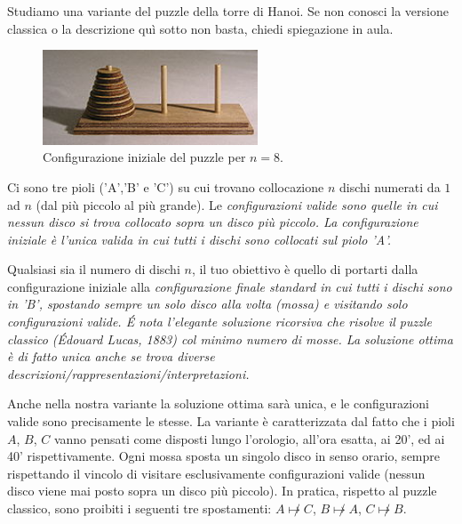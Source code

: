 \renewcommand{\nomebreve}{hanoi\_clockwise}
\renewcommand{\titolo}{The Hanoi puzzle with only clockwise moves}

\introduzione{}

Studiamo una variante del puzzle della torre di Hanoi. Se non conosci la versione classica o la descrizione quì sotto non basta, chiedi spiegazione in aula.

\begin{figure}[h!]
\begin{center}
  \noindent \includegraphics[width=0.57\textwidth]{figures/220px-Tower_of_Hanoi.jpeg}
\end{center}
\caption{Configurazione iniziale del puzzle per $n=8$.}
\end{figure}

Ci sono tre pioli ('A','B' e 'C') su cui trovano collocazione $n$ dischi numerati da $1$ ad $n$ (dal più piccolo al più grande). Le \it{configurazioni valide} sono quelle in cui nessun disco si trova collocato sopra un disco più piccolo.
La \it{configurazione iniziale} è l'unica valida in cui tutti i dischi sono collocati sul piolo 'A'.


Qualsiasi sia il numero di dischi $n$, il tuo obiettivo è quello di portarti dalla configurazione iniziale alla \it{configurazione finale standard} in cui tutti i dischi sono in 'B', spostando sempre un solo disco alla volta (mossa) e visitando solo configurazioni valide.
\'E nota l'elegante soluzione ricorsiva che risolve il puzzle classico (Édouard Lucas, 1883) col minimo numero di mosse. La soluzione ottima è di fatto unica anche se trova diverse descrizioni/rappresentazioni/interpretazioni.

Anche nella nostra variante la soluzione ottima sarà unica, e le configurazioni valide sono precisamente le stesse. La variante è caratterizzata dal fatto che i pioli $A$, $B$, $C$ vanno pensati come disposti lungo l'orologio, all'ora esatta, ai 20', ed ai 40' rispettivamente.
Ogni mossa sposta un singolo disco in senso orario, sempre rispettando il vincolo di visitare esclusivamente configurazioni valide (nessun disco viene mai posto sopra un disco più piccolo). In pratica, rispetto al puzzle classico, sono proibiti i seguenti tre spostamenti: $A\not \mapsto C$, $B\not \mapsto A$, $C\not \mapsto B$.\\


